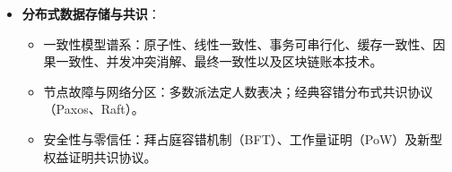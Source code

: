 \begin{itemize}
\begin{itemize}
        \begin{itemize}
            \item 现代语言与硬件内存模型：顺序一致性 (SC)与获取-释放一致性。
            \item 高并发内存管理：跨核心共享数据的安全内存回收机制；引用计数与替代方案（如 Hazard Pointers、基于历元 Epoch 的回收）。
            \item 块级数据布局与批量迁移：减少跨节点通信流量与提升局部性；计算与数据搬运的异步流水化重叠；数据内存布局对缓存命中的颠覆性影响（结构体数组 AoS 与 数组结构体 SoA 的性能对比）。
            \item 共享内存仿真：分布式共享内存（DSM）、远程直接内存访问（RDMA）。
        \end{itemize}
        \item \textbf{分布式数据存储与共识}：
        \begin{itemize}
            \item 一致性模型谱系：原子性、线性一致性、事务可串行化、缓存一致性、因果一致性、并发冲突消解、最终一致性以及区块链账本技术。
            \item 节点故障与网络分区：多数派法定人数表决；经典容错分布式共识协议（Paxos、Raft）。
            \item 安全性与零信任：拜占庭容错机制（BFT）、工作量证明（PoW）及新型权益证明共识协议。
        \end{itemize}
    \end{itemize}
\end{itemize}

